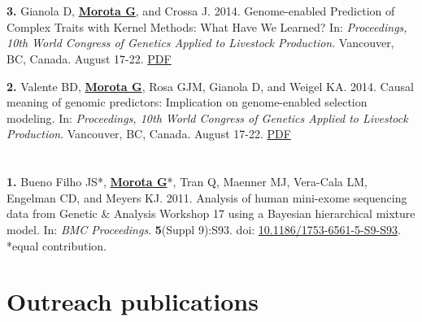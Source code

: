 \documentclass[margin,line,10pt]{res}
\newenvironment{list1}{
  \begin{list}{\ding{113}}{%
      \setlength{\itemsep}{0in}
      \setlength{\parsep}{0in} \setlength{\parskip}{0in}
      \setlength{\topsep}{0in} \setlength{\partopsep}{0in} 
      \setlength{\leftmargin}{0.17in}}}{\end{list}}
\begin{document}
\begin{resume}
\begin{list1}
  
\end{list1}

\section{}
\begin{list1}
\item [\bf{3}.] Gianola D, {\bf \underline{Morota G}}, and Crossa J. 2014. 
Genome-enabled Prediction of Complex Traits with Kernel Methods: What Have We Learned? In: \emph{Proceedings, 10th World Congress of Genetics Applied to Livestock Production}. Vancouver, BC, Canada. August 17-22.  
\textcolor{blue}{\href{http://www.morotalab.org/publications/pdf/gianola2014WCGALP.pdf}{PDF}}  


\vspace{0.5cm}

\item [\bf{2}.] Valente BD, {\bf \underline{Morota G}}, Rosa GJM, Gianola D, and  Weigel KA. 2014. 
Causal meaning of genomic predictors: Implication on genome-enabled selection modeling. In: \emph{Proceedings, 10th World Congress of Genetics Applied to Livestock Production}. Vancouver, BC, Canada. August 17-22. 
\textcolor{blue}{\href{http://www.morotalab.org/publications/pdf/valente2014WCGALP.pdf}{PDF}}
\end{list1}


\section{}
\begin{list1}
\item [\bf{1}.] Bueno Filho JS*, {\bf \underline{Morota G}}*, Tran Q, Maenner MJ, Vera-Cala LM, Engelman CD, and Meyers KJ. 2011. Analysis of human mini-exome sequencing data from Genetic \& Analysis Workshop 17 using a  Bayesian hierarchical mixture model. In: \emph{BMC Proceedings}. {\bf 5}(Suppl 9):S93. doi: \textcolor{blue}{\href{http://dx.doi.org/10.1186/1753-6561-5-S9-S93}{10.1186/1753-6561-5-S9-S93}}. *equal contribution.   
\end{list1}



\vspace{1.0cm}
\section{\sc Outreach publications}

\begin{list1}


\end{list1}
\end{resume}
\end{document}
